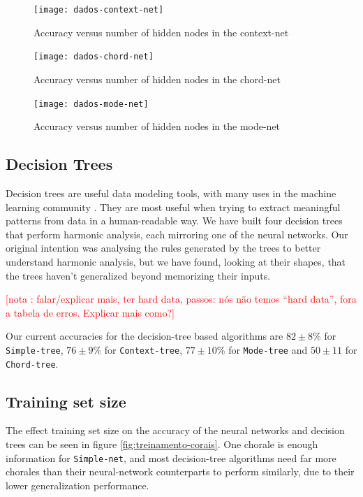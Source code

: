 \documentclass{article}
\newcounter{notacounter}
\newcommand{\nota}[1]{
  \addtocounter{notacounter}{1}
  \textcolor{red}{[nota \arabic{notacounter}: #1]}
}
\begin{document}
\begin{figure}
  \texttt{[image: dados-context-net]}
  \caption{Accuracy versus number of hidden nodes in the context-net}
  \label{fig:context-net}
\end{figure}

\begin{figure}
  \texttt{[image: dados-chord-net]}
  \caption{Accuracy versus number of hidden nodes in the chord-net}
  \label{fig:chord-net}
\end{figure}

\begin{figure}
  \texttt{[image: dados-mode-net]}
  \caption{Accuracy versus number of hidden nodes in the mode-net}
  \label{fig:mode-net}
\end{figure}

\subsection{Decision Trees}
\label{sec:decision-trees}

Decision trees are useful data modeling tools, with many uses in the
machine learning community \cite{Mitchell:1997:ML,
  russell02:aima}. They are most useful when trying to extract
meaningful patterns from data in a human-readable way. We have built
four decision trees that perform harmonic analysis, each mirroring one
of the neural networks. Our original intention was analysing the rules
generated by the trees to better understand harmonic analysis, but we
have found, looking at their shapes, that the trees haven't
generalized beyond memorizing their inputs. \nota{falar/explicar mais,
  ter hard data, passos: nós não temos ``hard data'', fora a tabela de
  erros. Explicar mais como?}

Our current accuracies for the decision-tree based algorithms are $82
\pm 8\%$ for \texttt{Simple-tree}, $76 \pm 9\%$ for
\texttt{Context-tree}, $77 \pm 10\%$ for \texttt{Mode-tree} and $50
\pm 11$ for \texttt{Chord-tree}.

\subsection{Training set size}

The effect training set size on the accuracy of the neural networks
and decision trees can be seen in figure
\ref{fig:treinamento-corais}. One chorale is enough information for
\texttt{Simple-net}, and most decision-tree algorithms need far more
chorales than their neural-network counterparts to perform similarly,
due to their lower generalization performance.
\end{document}
